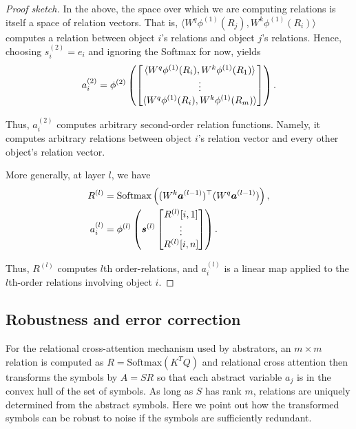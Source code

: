 \begin{proof}[Proof sketch]
	In the above, the space over which we are computing relations is itself a space of relation vectors. That is, $\langle W^q \phi^{(1)}(R_j), W^k \phi^{(1)}(R_i) \rangle$ computes a relation between object $i$'s relations and object $j$'s relations. Hence, choosing $s_i^{(2)} = e_i$ and ignoring the Softmax for now, yields
	\begin{equation*}
		a_i^{(2)} = \phi^{(2)}\left(\begin{bmatrix}\langle W^q \phi^{(1)}(R_i), W^k \phi^{(1)}(R_1) \rangle \\ \vdots \\ \langle W^q \phi^{(1)}(R_i), W^k \phi^{(1)}(R_\m) \rangle\end{bmatrix}\right).
	\end{equation*}

	Thus, $a_i^{(2)}$ computes arbitrary second-order relation functions. Namely, it computes arbitrary relations between object $i$'s relation vector and every other object's relation vector.

	More generally, at layer $l$, we have
	\begin{align*}
		R^{(l)} &= \Softmax\left((W^k \boldsymbol{a}^{(l-1)})^\top (W^q \boldsymbol{a}^{(l-1)})\right),\\
		a_i^{(l)} &= \phi^{(l)}\left(\boldsymbol{s}^{(l)} \begin{bmatrix}R^{(l)}[i,1] \\ \vdots \\ R^{(l)}[i,n]\end{bmatrix}\right).
	\end{align*}

	Thus, $R^{(l)}$ computes $l$th order-relations, and $a_i^{(l)}$ is a linear map applied to the $l$th-order relations involving object $i$.
\end{proof}


\subsection{Robustness and error correction}

For the relational cross-attention mechanism used by abstrators, an $m\times m$ relation
is computed as  $R = \mbox{Softmax}(K^T Q)$
and relational cross attention then transforms the symbols by
$A = SR$ so that each abstract variable $a_j$ is in the convex hull of the set of symbols.
As long as $S$ has rank $m$, relations are uniquely determined from the abstract symbols.
Here we point out how the transformed symbols can be robust to noise if the symbols are
sufficiently redundant.

